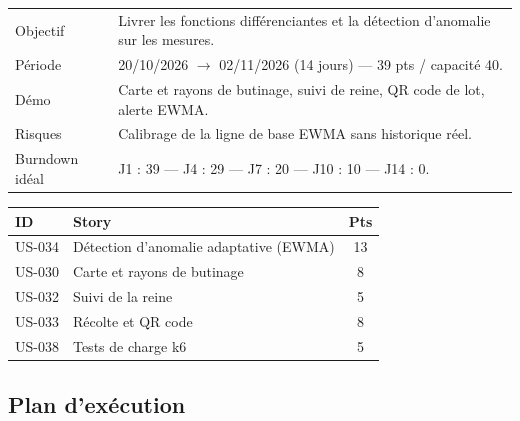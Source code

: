 \begin{center}
\begin{tabular}{lp{11cm}}
\toprule
Objectif  & Livrer les fonctions différenciantes et la détection d'anomalie
            sur les mesures. \\
Période   & 20/10/2026 $\rightarrow$ 02/11/2026 (14 jours) --- 39 pts / capacité 40. \\
Démo      & Carte et rayons de butinage, suivi de reine, QR code de lot,
            alerte EWMA. \\
Risques   & Calibrage de la ligne de base EWMA sans historique réel. \\
Burndown idéal & J1 : 39 --- J4 : 29 --- J7 : 20 --- J10 : 10 --- J14 : 0. \\
\bottomrule
\end{tabular}
\end{center}

\begin{center}
\begin{tabular}{lp{9cm}c}
\toprule
\textbf{ID} & \textbf{Story} & \textbf{Pts} \\
\midrule
US-034 & Détection d'anomalie adaptative (EWMA)     & 13 \\
US-030 & Carte et rayons de butinage                & 8 \\
US-032 & Suivi de la reine                          & 5 \\
US-033 & Récolte et QR code                         & 8 \\
US-038 & Tests de charge k6                         & 5 \\
\bottomrule
\end{tabular}
\end{center}

\subsection{Plan d'exécution}

